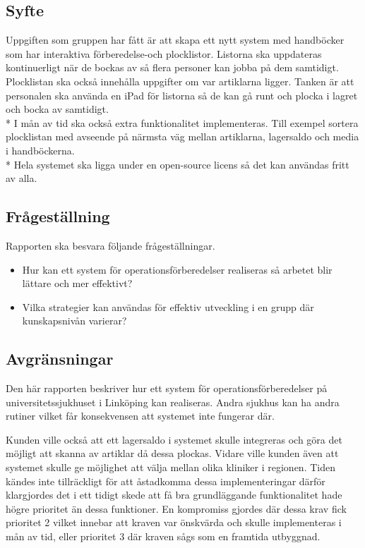 \documentclass{article}
\begin{document}
\subsection{Syfte}
Uppgiften som gruppen har fått är att skapa ett nytt system med handböcker som har interaktiva förberedelse-och plocklistor. Listorna ska uppdateras kontinuerligt när de bockas av så flera personer kan jobba på dem samtidigt. Plocklistan ska också innehålla uppgifter om var artiklarna ligger. Tanken är att personalen 
ska använda en iPad för listorna så de kan gå runt och plocka i lagret och bocka av samtidigt. \\*
I mån av tid ska också extra funktionalitet implementeras. Till exempel sortera plocklistan med avseende på närmsta väg mellan artiklarna, lagersaldo och media i handböckerna. \\*
Hela systemet ska ligga under en open-source licens så det kan användas fritt av alla.    

\subsection{Frågeställning}
Rapporten ska besvara följande frågeställningar.
\begin{itemize}
\item Hur kan ett system för operationsförberedelser realiseras så arbetet blir lättare och mer effektivt?
\item Vilka strategier kan användas för effektiv utveckling i en grupp där kunskapsnivån varierar? 
\end{itemize}

\subsection{Avgränsningar}
Den här rapporten beskriver hur ett system för operationsförberedelser på universitetssjukhuset i Linköping kan realiseras. Andra sjukhus kan ha andra rutiner vilket får konsekvensen att systemet inte fungerar där.

Kunden ville också att ett lagersaldo i systemet skulle integreras och göra det möjligt att skanna av artiklar då dessa plockas. Vidare ville kunden även att systemet skulle ge möjlighet att välja mellan olika kliniker i regionen. Tiden kändes inte tillräckligt för att åstadkomma dessa implementeringar därför klargjordes det i ett tidigt skede att få bra grundläggande funktionalitet hade högre prioritet än dessa funktioner. En kompromiss gjordes där dessa krav fick prioritet 2 vilket innebar att kraven var önskvärda och skulle implementeras i mån av tid, eller prioritet 3 där kraven sågs som en framtida utbyggnad.
\end{document}
